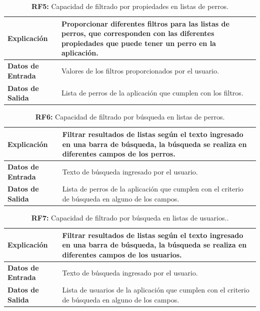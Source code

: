 \documentclass[a4paper, 12pt]{article}
\begin{document}
\begin{table}[H]
\captionsetup{justification=raggedright,singlelinecheck=false}
\caption{\textbf{RF5:} Capacidad de filtrado por propiedades en listas de perros.}
\label{tab:RF5}
	\begin{tabular}{|m{5cm}|m{10cm}|}
	\hline
	\textbf{Explicación} & Proporcionar diferentes filtros para las listas de perros, que corresponden con las diferentes propiedades que puede tener un perro en la aplicación. \\ 
	\hline
	\textbf{Datos de Entrada} & Valores de los filtros proporcionados por el usuario. \\ 
	\hline
	\textbf{Datos de Salida} & Lista de perros de la aplicación que cumplen con los filtros. \\ 
	\hline
\end{tabular}
\end{table}

\begin{table}[H]
\captionsetup{justification=raggedright,singlelinecheck=false}
\caption{\textbf{RF6:} Capacidad de filtrado por búsqueda en listas de perros.}
\label{tab:RF6}
	\begin{tabular}{|m{5cm}|m{10cm}|}
	\hline
	\textbf{Explicación} & Filtrar resultados de listas según el texto ingresado en una barra de búsqueda, la búsqueda se realiza en diferentes campos de los perros. \\ 
	\hline
	\textbf{Datos de Entrada} & Texto de búsqueda ingresado por el usuario. \\ 
	\hline
	\textbf{Datos de Salida} &  Lista de perros de la aplicación que cumplen con el criterio de búsqueda en alguno de los campos. \\ 
	\hline
\end{tabular}
\end{table}

\begin{table}[H]
\captionsetup{justification=raggedright,singlelinecheck=false}
\caption{\textbf{RF7:} Capacidad de filtrado por búsqueda en listas de usuarios..}
\label{tab:RF7}
	\begin{tabular}{|m{5cm}|m{10cm}|}
\hline
	\textbf{Explicación} & Filtrar resultados de listas según el texto ingresado en una barra de búsqueda, la búsqueda se realiza en diferentes campos de los usuarios. \\ 
	\hline
	\textbf{Datos de Entrada} & Texto de búsqueda ingresado por el usuario. \\ 
	\hline
	\textbf{Datos de Salida} &  Lista de usuarios de la aplicación que cumplen con el criterio de búsqueda en alguno de los campos. \\ 
	\hline
\end{tabular}
\end{table}
\end{document}
